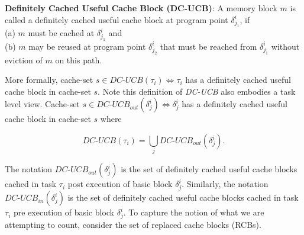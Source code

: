 \begin{definition}
\textbf{Definitely Cached Useful Cache Block (DC-UCB)}: A memory block $m$ is called a definitely cached useful cache block at program point \begin{math}\delta_{j_{1}}^{i}\end{math}, if \\(a) $m$ must be cached at \begin{math}\delta_{j_{1}}^{i}\end{math} and \\(b) $m$ may be reused at program point \begin{math}\delta_{j_{2}}^{i}\end{math} that must be reached from \begin{math}\delta_{j_{1}}^{i}\end{math} without eviction of $m$ on this path.
\end{definition}

\noindent More formally, cache-set \begin{math}s \in \textit{DC-UCB}(\tau_{i}) \Leftrightarrow \tau_{i}\end{math} has a definitely cached useful cache block in cache-set $s$.  Note this definition of \textit{DC-UCB} also embodies a task level view.  Cache-set \begin{math}s \in \textit{DC-UCB}_{out}(\delta_{j}^{i}) \Leftrightarrow \delta_{j}^{i}\end{math} has a definitely cached useful cache block in cache-set $s$ where

\begin{equation}\label{eqn:dcucb-task}
    \textit{DC-UCB}(\tau_{i}) = \bigcup_{j} \textit{DC-UCB}_{out}(\delta_{j}^{i}).
\end{equation}

\noindent The notation
\begin{math}\textit{DC-UCB}_{out}(\delta_{j}^{i})\end{math} is the set of definitely cached useful cache blocks cached in task \begin{math}\tau_{i}\end{math} post execution of basic block \begin{math}\delta_{j}^{i}\end{math}.  Similarly, the notation \begin{math}\textit{DC-UCB}_{in}(\delta_{j}^{i})\end{math} is the set of definitely cached useful cache blocks cached in task \begin{math}\tau_{i}\end{math} pre execution of basic block \begin{math}\delta_{j}^{i}\end{math}. To capture the notion of what we are attempting to count, consider the set of replaced cache blocks (RCBs).

